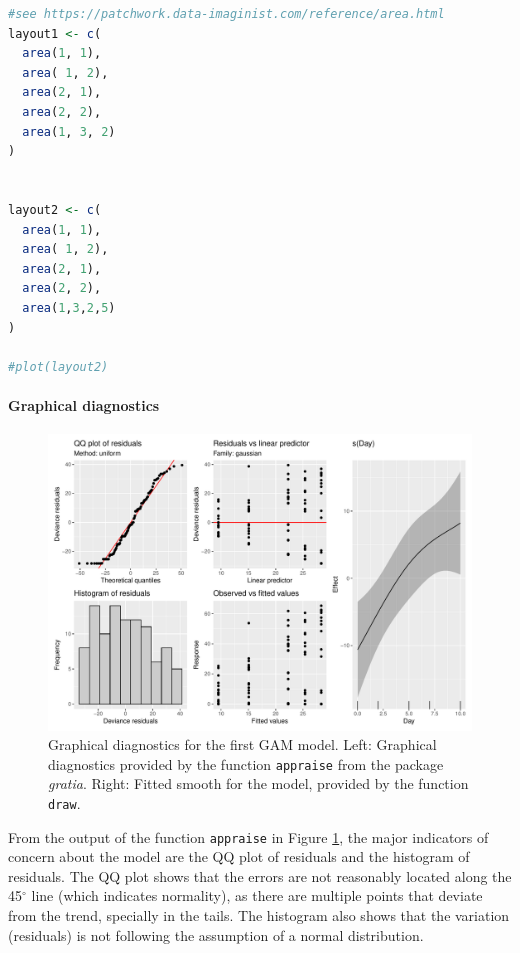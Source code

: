 \documentclass[
]{article}
\newcommand{\passthrough}[1]{#1}
\let\oldparagraph\paragraph
\renewcommand{\paragraph}[1]{\oldparagraph{#1}\mbox{}}
\begin{document}
\begin{lstlisting}[language=R]
#see https://patchwork.data-imaginist.com/reference/area.html
layout1 <- c(
  area(1, 1),
  area( 1, 2),
  area(2, 1),
  area(2, 2),
  area(1, 3, 2)
)


layout2 <- c(
  area(1, 1),
  area( 1, 2),
  area(2, 1),
  area(2, 2),
  area(1,3,2,5)
)

#plot(layout2)
\end{lstlisting}

\hypertarget{graphical-diagnostics}{%
\paragraph{Graphical diagnostics}\label{graphical-diagnostics}}

\begin{figure}[H]

{\centering \includegraphics[width=0.75\linewidth,]{Full_document_files/figure-latex/first-GAM-diag-1} 

}

\caption{Graphical diagnostics for the first GAM model. Left: Graphical diagnostics provided by the function \passthrough{\lstinline!appraise!} from the package \emph{gratia}. Right: Fitted smooth for the model, provided by the function \passthrough{\lstinline!draw!}.}\label{fig:first-GAM-diag}
\end{figure}

From the output of the function \passthrough{\lstinline!appraise!} in Figure \ref{fig:first-GAM-diag}, the major indicators of concern about the model are the QQ plot of residuals and the histogram of residuals. The QQ plot shows that the errors are not reasonably located along the 45\(^{\circ}\) line (which indicates normality), as there are multiple points that deviate from the trend, specially in the tails. The histogram also shows that the variation (residuals) is not following the assumption of a normal distribution.
\end{document}
